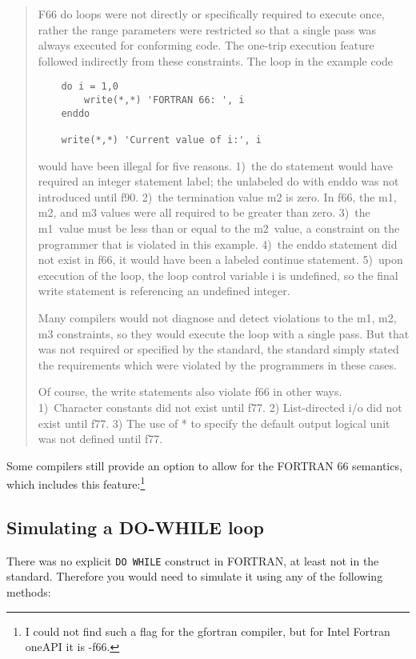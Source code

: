 \begin{quote}
F66 do loops were not directly or specifically required to execute once, rather the
range parameters were restricted so that a single pass was always executed for conforming
code. The one-trip execution feature followed indirectly from these constraints. The loop
in the example code

\begin{verbatim}
    do i = 1,0
        write(*,*) 'FORTRAN 66: ', i
    enddo

    write(*,*) 'Current value of i:', i
\end{verbatim}

would have been illegal for five reasons. 1)~the do statement would have required an
integer statement label; the unlabeled do with enddo was not introduced until f90. 2)~the
termination value m2 is zero. In f66, the m1, m2, and m3 values were all required
to be greater than zero. 3)~the m1~value must be less than or equal to the m2~value,
a constraint on the programmer that is violated in this example. 4)~the enddo
statement did not exist in f66, it would have been a labeled continue statement. 5)~upon
execution of the loop, the loop control variable i is undefined, so the final write
statement is referencing an undefined integer.

Many compilers would not diagnose and detect violations to the m1, m2, m3 constraints,
so they would execute the loop with a single pass. But that was not required or
specified by the standard, the standard simply stated the requirements which were
violated by the programmers in these cases.

Of course, the write statements also violate f66 in other ways. 1)~Character constants
did not exist until f77. 2) List-directed i/o did not exist until f77. 3) The use of * to
specify the default output logical unit was not defined until f77.
\end{quote}

Some compilers still provide an option to allow for the FORTRAN 66 semantics, \cite{F66DoLoops}
which includes this feature:\footnote{I could not find such a flag for the
gfortran compiler, but for Intel Fortran oneAPI it is -f66.}


\subsection{Simulating a DO-WHILE loop}
There was no explicit \verb+DO WHILE+ construct in FORTRAN, at least not
in the standard. Therefore you would need to simulate it using any of the
following methods:

